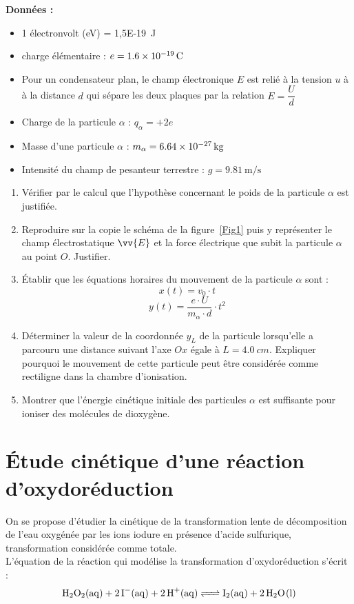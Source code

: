 \documentclass[a4paper,12pt,fleqn]{article}%
\begin{document}
\textbf{Données :}
\begin{itemize}
    \item 1 électronvolt (eV) = \SI{1,5E-19}{J}
    \item charge élémentaire : $e=\SI{1,6E-19}{C}$
    \item Pour un condensateur plan, le champ électronique $E$ est relié à la tension $u$ à à la distance $d$ qui sépare les deux plaques par la relation $E=\dfrac{U}{d}$
    \item Charge de la particule $\alpha$ : $q_{\alpha} = + 2 e$
    \item Masse d'une particule $\alpha$ : $m_{\alpha} = \SI{6,64E-27}{kg}$
    \item Intensité du champ de pesanteur terrestre : $g = \SI{9,81}{\meter\per\second}$
\end{itemize}


\begin{enumerate}
    \item Vérifier par le calcul que l’hypothèse concernant le poids de la particule $\alpha$ est justifiée.
    \item Reproduire sur la copie le schéma de la figure~\ref{Fig1} puis y représenter le champ électrostatique $\vv{E}$ et la force électrique que subit la particule $\alpha$ au point $O$. Justifier.
    \item Établir que les équations horaires du mouvement de la particule $\alpha$ sont : $$x(t)=v_0 \cdot t$$
    $$y(t)= \dfrac{e\cdot U}{m_{\alpha}\cdot d}\cdot t^2$$
    \item Déterminer la valeur de la coordonnée $y_L$ de la particule lorsqu’elle a parcouru une distance suivant l’axe $Ox$ égale à $L = \SI{4,0}{cm}$. Expliquer pourquoi le mouvement de cette particule peut être considérée comme rectiligne dans la chambre d’ionisation.
    \item Montrer que l’énergie cinétique initiale des particules $\alpha$ est suffisante pour ioniser des molécules de dioxygène.
\end{enumerate}


\section{Étude cinétique d’une réaction d’oxydoréduction}
On se propose d’étudier la cinétique de la transformation lente de décomposition de l’eau oxygénée par les ions iodure en présence d’acide sulfurique, transformation considérée comme totale.\\
L’équation de la réaction qui modélise la transformation d’oxydoréduction s’écrit :
$$\ce{H2O2(aq) + 2 I-(aq) + 2 H+(aq) <=> I2(aq) + 2H2O(l)}$$
\end{document}
